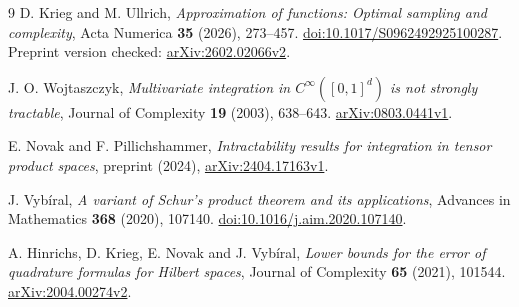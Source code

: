 \documentclass[11pt]{article}
\begin{document}
\begin{thebibliography}{9}
D. Krieg and M. Ullrich,
\emph{Approximation of functions: Optimal sampling and complexity},
Acta Numerica \textbf{35} (2026), 273--457.
\href{https://doi.org/10.1017/S0962492925100287}{doi:10.1017/S0962492925100287}.
Preprint version checked:
\href{https://arxiv.org/abs/2602.02066v2}{arXiv:2602.02066v2}.

J. O. Wojtaszczyk,
\emph{Multivariate integration in $C^\infty([0,1]^d)$ is not strongly tractable},
Journal of Complexity \textbf{19} (2003), 638--643.
\href{https://arxiv.org/abs/0803.0441v1}{arXiv:0803.0441v1}.

E. Novak and F. Pillichshammer,
\emph{Intractability results for integration in tensor product spaces},
preprint (2024),
\href{https://arxiv.org/abs/2404.17163v1}{arXiv:2404.17163v1}.

J. Vyb\'iral,
\emph{A variant of Schur's product theorem and its applications},
Advances in Mathematics \textbf{368} (2020), 107140.
\href{https://doi.org/10.1016/j.aim.2020.107140}{doi:10.1016/j.aim.2020.107140}.

A. Hinrichs, D. Krieg, E. Novak and J. Vyb\'iral,
\emph{Lower bounds for the error of quadrature formulas for Hilbert spaces},
Journal of Complexity \textbf{65} (2021), 101544.
\href{https://arxiv.org/abs/2004.00274v2}{arXiv:2004.00274v2}.
\end{thebibliography}
\end{document}
